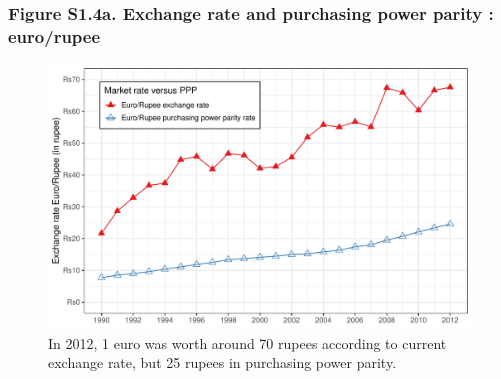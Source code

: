\documentclass[t]{beamer}\usepackage[]{graphicx}\usepackage[]{color}
\newenvironment{knitrout}{}{} %
\begin{document}
\begin{frame}[label=Figure_S1_4a,fragile]
\frametitle{Figure S1.4a. Exchange rate and purchasing power parity : euro/rupee}
\begin{figure}[t]
\begin{minipage}[b]{\textwidth}
\centering
\begin{knitrout}\footnotesize
{}\color{fgcolor}

{\centering \includegraphics[width=1\linewidth]{figures/color/Figure_S1_4a} 

}



\end{knitrout}
\caption{In 2012, 1 euro was worth around 70 rupees according to current exchange rate, but 25 rupees in purchasing power parity.}
\end{minipage}
\end{figure}
\end{frame}
\end{document}
